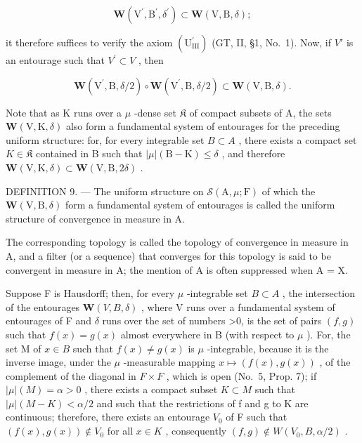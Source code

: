 \[
\boldsymbol {W} \left(\mathrm{V} ^ {\prime}, \mathrm{B} ^ {\prime}, \delta^ {\prime}\right) \subset \boldsymbol {W} (\mathrm{V}, \mathrm{B}, \delta);
\]

it therefore suffices to verify the axiom \((\mathrm{U}_{\mathrm{III}}^{\prime})\) (GT, II, §1, No.~1). Now, if \(V'\) is an entourage such that \(V^{\prime} \subset V\) , then

\[
\boldsymbol {W} \left(\mathrm{V} ^ {\prime}, \mathrm{B}, \delta / 2\right) \circ \boldsymbol {W} \left(\mathrm{V} ^ {\prime}, \mathrm{B}, \delta / 2\right) \subset \boldsymbol {W} (\mathrm{V}, \mathrm{B}, \delta).
\]

Note that as K runs over a \(\mu\) -dense set \(\mathfrak{K}\) of compact subsets of A, the sets \(\boldsymbol{W}(\mathrm{V},\mathrm{K},\delta)\) also form a fundamental system of entourages for the preceding uniform structure: for, for every integrable set \(B\subset A\) , there exists a compact set \(K\in \mathfrak{K}\) contained in B such that \(|\mu|(\mathrm{B}-\mathrm{K})\leqslant\delta\) , and therefore \(\boldsymbol{W}(\mathrm{V},\mathrm{K},\delta)\subset\boldsymbol{W}(\mathrm{V},\mathrm{B},2\delta)\) .

DEFINITION 9. --- The uniform structure on \(\mathcal{S}(\mathrm{A},\mu;\mathrm{F})\) of which the \(\boldsymbol{W}(\mathrm{V},\mathrm{B},\delta)\) form a fundamental system of entourages is called the uniform structure of convergence in measure in A.

The corresponding topology is called the topology of convergence in measure in A, and a filter (or a sequence) that converges for this topology is said to be convergent in measure in A; the mention of A is often suppressed when A = X.

Suppose F is Hausdorff; then, for every \(\mu\) -integrable set \(B \subset A\) , the intersection of the entourages \(\boldsymbol{W}(V, B, \delta)\) , where V runs over a fundamental system of entourages of F and \(\delta\) runs over the set of numbers \textgreater0, is the set of pairs \((f, g)\) such that \(f(x) = g(x)\) almost everywhere in B (with respect to \(\mu\) ). For, the set M of \(x \in B\) such that \(f(x) \neq g(x)\) is \(\mu\) -integrable, because it is the inverse image, under the \(\mu\) -measurable mapping \(x \mapsto (f(x), g(x))\) , of the complement of the diagonal in \(F \times F\) , which is open (No.~5, Prop. 7); if \(|\mu|(M) = \alpha > 0\) , there exists a compact subset \(K \subset M\) such that \(|\mu|(M - K) < \alpha/2\) and such that the restrictions of f and g to K are continuous; therefore, there exists an entourage \(V_0\) of F such that \((f(x), g(x)) \notin V_0\) for all \(x \in K\) , consequently \((f, g) \notin W(V_0, B, \alpha/2)\) .

